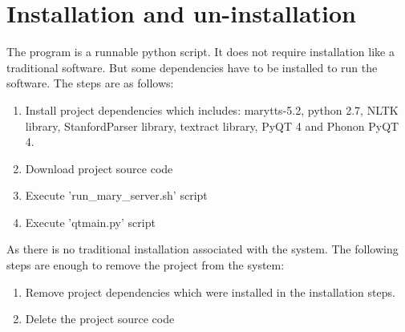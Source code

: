 \documentclass[oneside,a4paper,12pt]{book}
\begin{document}
     \section{Installation and un-installation}
     The program is a runnable python script. It does not require installation like a traditional software. But some dependencies have to be installed to run the software. The steps are as follows:
     \begin{enumerate}
     	\item Install project dependencies which includes: marytts-5.2, python 2.7, NLTK library, StanfordParser library, textract library, PyQT 4 and Phonon PyQT 4.
     	\item Download project source code
     	\item Execute 'run\_mary\_server.sh' script
     	\item Execute 'qtmain.py' script
     \end{enumerate}
     As there is no traditional installation associated with the system. The following steps are enough to remove the project from the system:
     \begin{enumerate}
     	\item Remove project dependencies which were installed in the installation steps.
     	\item Delete the project source code
     \end{enumerate}
\end{document}
